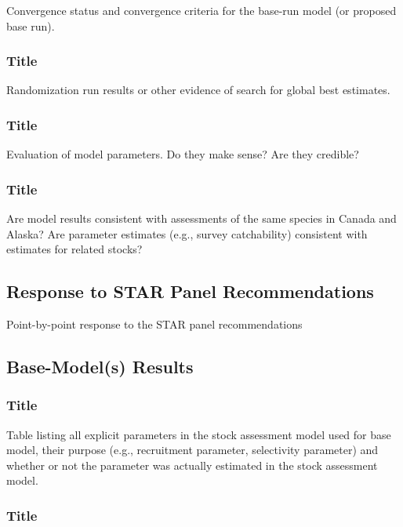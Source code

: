\documentclass[12pt,]{article}
\begin{document}
Convergence status and convergence criteria for the base-run model (or
proposed base run).

\subsubsection{Title}\label{title-21}

Randomization run results or other evidence of search for global best
estimates.

\subsubsection{Title}\label{title-22}

Evaluation of model parameters. Do they make sense? Are they credible?

\subsubsection{Title}\label{title-23}

Are model results consistent with assessments of the same species in
Canada and Alaska? Are parameter estimates (e.g., survey catchability)
consistent with estimates for related stocks?

\subsection{Response to STAR Panel
Recommendations}\label{response-to-star-panel-recommendations}

Point-by-point response to the STAR panel recommendations

\subsection{Base-Model(s) Results}\label{base-models-results}

\subsubsection{Title}\label{title-24}

Table listing all explicit parameters in the stock assessment model used
for base model, their purpose (e.g., recruitment parameter, selectivity
parameter) and whether or not the parameter was actually estimated in
the stock assessment model.

\subsubsection{Title}\label{title-25}
\end{document}
